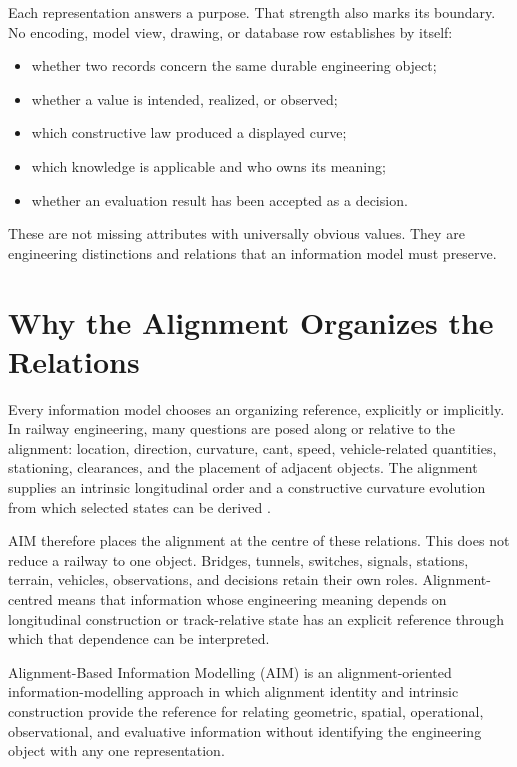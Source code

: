 Each representation answers a purpose. That strength also marks its boundary.
No encoding, model view, drawing, or database row establishes by itself:

\begin{itemize}
\item whether two records concern the same durable engineering object;
\item whether a value is intended, realized, or observed;
\item which constructive law produced a displayed curve;
\item which knowledge is applicable and who owns its meaning;
\item whether an evaluation result has been accepted as a decision.
\end{itemize}

These are not missing attributes with universally obvious values. They are
engineering distinctions and relations that an information model must preserve.

\section{Why the Alignment Organizes the Relations}

Every information model chooses an organizing reference, explicitly or
implicitly. In railway engineering, many questions are posed along or relative
to the alignment: location, direction, curvature, cant, speed, vehicle-related
quantities, stationing, clearances, and the placement of adjacent objects. The
alignment supplies an intrinsic longitudinal order and a constructive curvature
evolution from which selected states can be derived
\cite{Kufver1997MathematicalDescription,Kufver2000RailwayAlignment}.

AIM therefore places the alignment at the centre of these relations. This does
not reduce a railway to one object. Bridges, tunnels, switches, signals,
stations, terrain, vehicles, observations, and decisions retain their own roles.
Alignment-centred means that information whose engineering meaning depends on
longitudinal construction or track-relative state has an explicit reference
through which that dependence can be interpreted.

\begin{definition}
Alignment-Based Information Modelling (AIM) is an alignment-oriented
information-modelling approach in which alignment identity and intrinsic
construction provide the reference for relating geometric, spatial,
operational, observational, and evaluative information without identifying the
engineering object with any one representation.
\end{definition}

